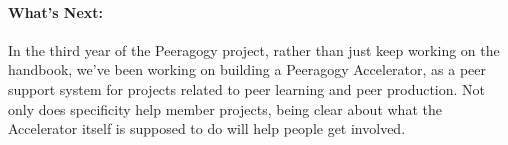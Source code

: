 \paragraph{What's Next:} In the third year of the Peeragogy project, rather
than just keep working on the handbook, we've been working on building a
Peeragogy Accelerator, as a peer support system for projects related to
peer learning and peer production. Not only does specificity help member
projects, being clear about what the Accelerator itself is supposed to
do will help people get involved.
